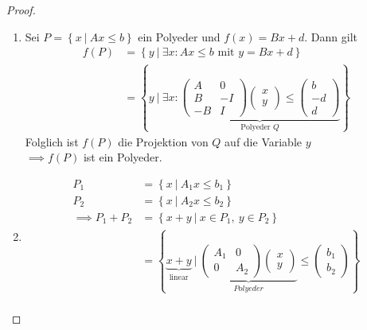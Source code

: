 \begin{proof}
	\begin{enumerate}[label = (\alph*)]
		\item Sei $P = \left\{ x \ |\ Ax \leq b \right\}$ ein Polyeder und $f(x)= Bx+d$.
			Dann gilt 
			\begin{align*}
				f(P) &= \left\{ y \ |\ \exists x: Ax \leq b \text{ mit } y = Bx +d \right\}\\
					 &= \left\{ y \ |\ \exists x: \underbrace{
					 \begin{pmatrix}
						 A & 0\\
						 B &-I\\
						 -B & I
					 \end{pmatrix}
					 \begin{pmatrix}
					 	x\\y
					 \end{pmatrix}
					 \leq
					 \begin{pmatrix}
					 	b\\
						-d\\
						d
					 \end{pmatrix}
				 	}_{\text{Polyeder }Q }
					 \right\}
			\end{align*}
			Folglich ist $f(P)$ die Projektion von $Q$ auf die Variable $y$ \\
			$\implies f(P)$ ist ein Polyeder.
		\item 
			\begin{align*}
				P_{1} &= \left\{ x\ |\ A_{1}x \leq b_{1} \right\}\\
				P_{2} &=  \left\{ x\ |\ A_{2}x \leq b_{2} \right\}\\
			\implies P_{1}+P_{2} &=  \left\{ x+y\ |\ x \in P_{1},\ y \in P_{2} \right\}\\
								 &=\left\{ \underbrace{x+y}_{\text{linear}}\ |\ 
									\underbrace{
								 	\begin{pmatrix}
										 A_{1} & 0 \\
										 0 & A_{2}
								 	\end{pmatrix}
									\begin{pmatrix}
										x\\y
									\end{pmatrix}
									}_{Polyeder}
									\leq
									\begin{pmatrix}
										b_{1}\\
										b_{2}
									\end{pmatrix}
								 	\right\}\\
			\end{align*}
	\end{enumerate}
\end{proof}
